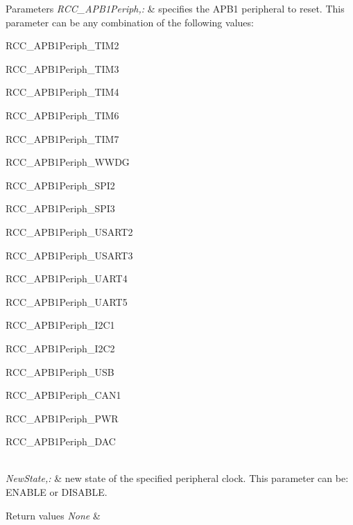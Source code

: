 \begin{DoxyParams}{Parameters}
{\em R\-C\-C\-\_\-\-A\-P\-B1\-Periph,\-:} & specifies the A\-P\-B1 peripheral to reset. This parameter can be any combination of the following values\-: \begin{DoxyItemize}
\item R\-C\-C\-\_\-\-A\-P\-B1\-Periph\-\_\-\-T\-I\-M2 \item R\-C\-C\-\_\-\-A\-P\-B1\-Periph\-\_\-\-T\-I\-M3 \item R\-C\-C\-\_\-\-A\-P\-B1\-Periph\-\_\-\-T\-I\-M4 \item R\-C\-C\-\_\-\-A\-P\-B1\-Periph\-\_\-\-T\-I\-M6 \item R\-C\-C\-\_\-\-A\-P\-B1\-Periph\-\_\-\-T\-I\-M7 \item R\-C\-C\-\_\-\-A\-P\-B1\-Periph\-\_\-\-W\-W\-D\-G \item R\-C\-C\-\_\-\-A\-P\-B1\-Periph\-\_\-\-S\-P\-I2 \item R\-C\-C\-\_\-\-A\-P\-B1\-Periph\-\_\-\-S\-P\-I3 \item R\-C\-C\-\_\-\-A\-P\-B1\-Periph\-\_\-\-U\-S\-A\-R\-T2 \item R\-C\-C\-\_\-\-A\-P\-B1\-Periph\-\_\-\-U\-S\-A\-R\-T3 \item R\-C\-C\-\_\-\-A\-P\-B1\-Periph\-\_\-\-U\-A\-R\-T4 \item R\-C\-C\-\_\-\-A\-P\-B1\-Periph\-\_\-\-U\-A\-R\-T5 \item R\-C\-C\-\_\-\-A\-P\-B1\-Periph\-\_\-\-I2\-C1 \item R\-C\-C\-\_\-\-A\-P\-B1\-Periph\-\_\-\-I2\-C2 \item R\-C\-C\-\_\-\-A\-P\-B1\-Periph\-\_\-\-U\-S\-B \item R\-C\-C\-\_\-\-A\-P\-B1\-Periph\-\_\-\-C\-A\-N1 \item R\-C\-C\-\_\-\-A\-P\-B1\-Periph\-\_\-\-P\-W\-R \item R\-C\-C\-\_\-\-A\-P\-B1\-Periph\-\_\-\-D\-A\-C \end{DoxyItemize}
\\
\hline
{\em New\-State,\-:} & new state of the specified peripheral clock. This parameter can be\-: E\-N\-A\-B\-L\-E or D\-I\-S\-A\-B\-L\-E. \\
\hline
\end{DoxyParams}

\begin{DoxyRetVals}{Return values}
{\em None} & \\
\hline
\end{DoxyRetVals}

